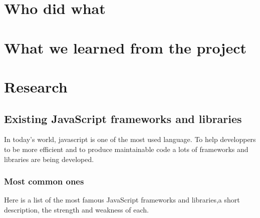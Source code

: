 \documentclass[12pt]{report}%
\begin{document}
\chapter{Who did what}



\chapter{What we learned from the project}


\chapter{Research}
\section{Existing JavaScript frameworks and libraries}
In today's world, javascript is one of the most used language. To help developpers to be more efficient and to produce maintainable code a lots of frameworks and libraries are being developed. 

\subsection{Most common ones}
Here is a list of the most famous JavaScript frameworks and libraries,a short description,  the strength and weakness of each.
\end{document}
